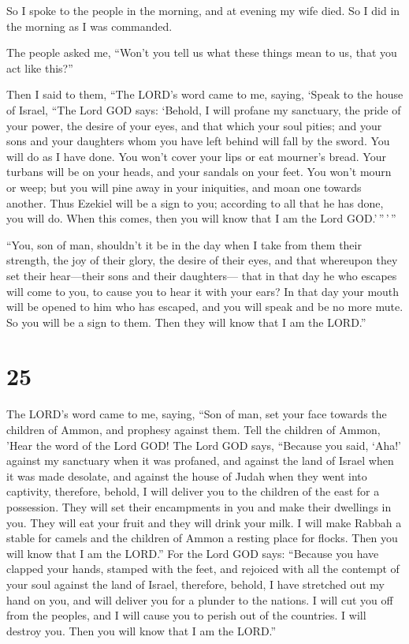  So I spoke to the people in the morning, and at evening my
wife died. So I did in the morning as I was commanded.

 The people asked me, ``Won't you tell us what these things
mean to us, that you act like this?''

 Then I said to them, ``The LORD's word came to me, saying,
 `Speak to the house of Israel, ``The Lord GOD says:
`Behold, I will profane my sanctuary, the pride of your power, the
desire of your eyes, and that which your soul pities; and your sons and
your daughters whom you have left behind will fall by the sword.
 You will do as I have done. You won't cover your lips or
eat mourner's bread.  Your turbans will be on your heads,
and your sandals on your feet. You won't mourn or weep; but you will
pine away in your iniquities, and moan one towards another.
 Thus Ezekiel will be a sign to you; according to all that
he has done, you will do. When this comes, then you will know that I am
the Lord GOD.'\,''\,'\,''

 ``You, son of man, shouldn't it be in the day when I take
from them their strength, the joy of their glory, the desire of their
eyes, and that whereupon they set their hear---their sons and their
daughters---  that in that day he who escapes will come to
you, to cause you to hear it with your ears?  In that day
your mouth will be opened to him who has escaped, and you will speak and
be no more mute. So you will be a sign to them. Then they will know that
I am the LORD.''

\hypertarget{section-23}{%
\section{25}\label{section-23}}

 The LORD's word came to me, saying,  ``Son of
man, set your face towards the children of Ammon, and prophesy against
them.  Tell the children of Ammon, 'Hear the word of the
Lord GOD! The Lord GOD says, ``Because you said, `Aha!' against my
sanctuary when it was profaned, and against the land of Israel when it
was made desolate, and against the house of Judah when they went into
captivity,  therefore, behold, I will deliver you to the
children of the east for a possession. They will set their encampments
in you and make their dwellings in you. They will eat your fruit and
they will drink your milk.  I will make Rabbah a stable for
camels and the children of Ammon a resting place for flocks. Then you
will know that I am the LORD.''  For the Lord GOD says:
``Because you have clapped your hands, stamped with the feet, and
rejoiced with all the contempt of your soul against the land of Israel,
 therefore, behold, I have stretched out my hand on you, and
will deliver you for a plunder to the nations. I will cut you off from
the peoples, and I will cause you to perish out of the countries. I will
destroy you. Then you will know that I am the LORD.''

